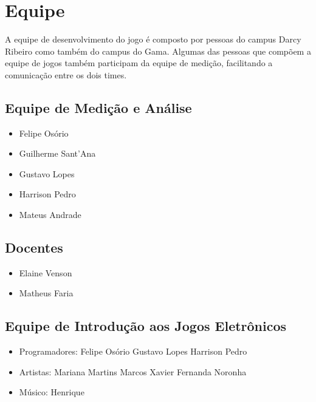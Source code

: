 \chapter{Equipe}
	A equipe de desenvolvimento do jogo é composto por pessoas do campus Darcy Ribeiro como também do campus do Gama. Algumas das pessoas que compõem a equipe de jogos também participam da equipe de medição, facilitando a comunicação entre os dois times.

\section{Equipe de Medição e Análise}
	\begin{itemize}
		\item Felipe Osório
		\item Guilherme Sant'Ana
		\item Gustavo Lopes
		\item Harrison Pedro
		\item Mateus Andrade
	\end{itemize}

\section{Docentes}
	\begin{itemize}
		\item Elaine Venson
		\item Matheus Faria
	\end{itemize}

\section{Equipe de Introdução aos Jogos Eletrônicos}
	\begin{itemize}
		\item Programadores:
		\subitem Felipe Osório
		\subitem Gustavo Lopes
		\subitem Harrison Pedro
		\item Artistas:
		\subitem Mariana Martins
		\subitem Marcos Xavier
		\subitem Fernanda Noronha
		\item Músico:
		\subitem Henrique
	\end{itemize}